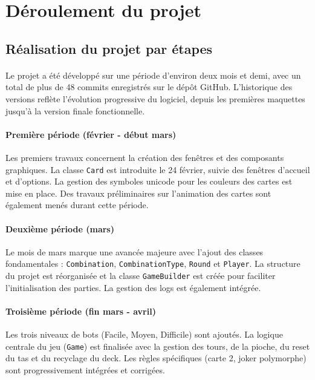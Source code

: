 \newpage
\section{Déroulement du projet}
\label{sec:deroulement}

\subsection{Réalisation du projet par étapes}
\paragraph{} Le projet a été développé sur une période d'environ deux mois et demi, avec un total de plus de 48 commits enregistrés sur le dépôt GitHub. L'historique des versions reflète l'évolution progressive du logiciel, depuis les premières maquettes jusqu'à la version finale fonctionnelle.

\paragraph{Première période (février - début mars)}
Les premiers travaux concernent la création des fenêtres et des composants graphiques. La classe \texttt{Card} est introduite le 24 février, suivie des fenêtres d'accueil et d'options. La gestion des symboles unicode pour les couleurs des cartes est mise en place. Des travaux préliminaires sur l'animation des cartes sont également menés durant cette période.

\paragraph{Deuxième période (mars)}
Le mois de mars marque une avancée majeure avec l'ajout des classes fondamentales : \texttt{Combination}, \texttt{CombinationType}, \texttt{Round} et \texttt{Player}. La structure du projet est réorganisée et la classe \texttt{GameBuilder} est créée pour faciliter l'initialisation des parties. La gestion des logs est également intégrée.

\paragraph{Troisième période (fin mars - avril)}
Les trois niveaux de bots (Facile, Moyen, Difficile) sont ajoutés. La logique centrale du jeu (\texttt{Game}) est finalisée avec la gestion des tours, de la pioche, du reset du tas et du recyclage du deck. Les règles spécifiques (carte 2, joker polymorphe) sont progressivement intégrées et corrigées.

